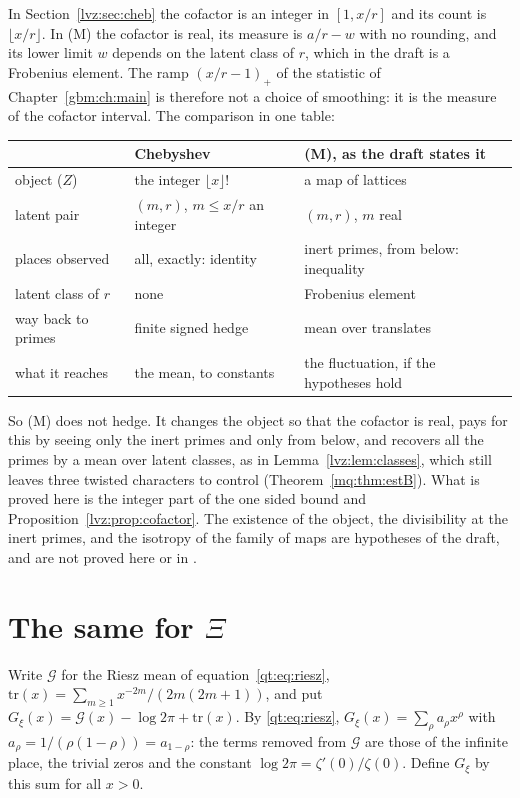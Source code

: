 In Section~\ref{lvz:sec:cheb} the cofactor is an integer in $[1,x/r]$ and its count is $\lfloor x/r\rfloor$. In (M) the cofactor is real, its measure is $a/r-w$ with no rounding, and its lower limit $w$ depends on the latent class of $r$, which in the draft is a Frobenius element. The ramp $(x/r-1)_+$ of the statistic of Chapter~\ref{gbm:ch:main} is therefore not a choice of smoothing: it is the measure of the cofactor interval. The comparison in one table:
\begin{center}
\small
\begin{tabular}{p{3.1cm}p{3.4cm}p{3.9cm}}
\hline
 & Chebyshev & (M), as the draft states it\\
\hline
object ($Z$) & the integer $\lfloor x\rfloor!$ & a map of lattices\\
latent pair & $(m,r)$, $m\le x/r$ an integer & $(m,r)$, $m$ real\\
places observed & all, exactly: identity & inert primes, from below: inequality\\
latent class of $r$ & none & Frobenius element\\
way back to primes & finite signed hedge & mean over translates\\
what it reaches & the mean, to constants & the fluctuation, if the hypotheses hold\\
\hline
\end{tabular}
\end{center}
So (M) does not hedge. It changes the object so that the cofactor is real, pays for this by seeing only the inert primes and only from below, and recovers all the primes by a mean over latent classes, as in Lemma~\ref{lvz:lem:classes}, which still leaves three twisted characters to control (Theorem~\ref{mq:thm:estB}). What is proved here is the integer part of the one sided bound and Proposition~\ref{lvz:prop:cofactor}. The existence of the object, the divisibility at the inert primes, and the isotropy of the family of maps are hypotheses of the draft, and are not proved here or in \cite{Rub26}.

\section{The same for $\Xi$}\label{lvz:sec:xi}

Write $\mathcal G$ for the Riesz mean of equation~\eqref{qt:eq:riesz}, $\mathrm{tr}(x)=\sum_{m\ge1}x^{-2m}/(2m(2m+1))$, and put $G_\xi(x)=\mathcal G(x)-\log2\pi+\mathrm{tr}(x)$. By \eqref{qt:eq:riesz}, $G_\xi(x)=\sum_\rho a_\rho x^\rho$ with $a_\rho=1/(\rho(1-\rho))=a_{1-\rho}$: the terms removed from $\mathcal G$ are those of the infinite place, the trivial zeros and the constant $\log2\pi=\zeta'(0)/\zeta(0)$. Define $G_\xi$ by this sum for all $x>0$.

